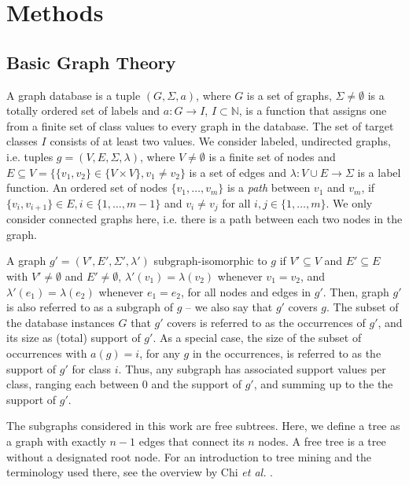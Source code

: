 \documentclass{sig-alternate}
\begin{document}
\section{Methods}
\label{s:Methods}

\subsection{Basic Graph Theory}
\label{ss:BasicGraphTheory}
A graph database is a tuple $(G, \Sigma, a)$, where $G$ is a set of graphs,
$\Sigma \ne \emptyset$  is a totally ordered set of labels and $a: G
\rightarrow I$, $I \subset \mathbb{N}$, is a function that assigns one from a
finite set of class values to every graph in the database.  The set of target
classes $I$ consists of at least two values.  We consider labeled, undirected
graphs, i.e. tuples $g=(V,E,\Sigma,\lambda)$, where $V\ne \emptyset$ is a
finite set of nodes and $E \subseteq V = \{\{v_1, v_2\} \in \{V \times V\}, v_1
\ne v_2\}$ is a set of edges and $\lambda: V\cup E \rightarrow \Sigma$ is a
label function.  
An ordered set of nodes $\{ v_1, \ldots, v_m\}$ is a \emph{path} between $v_1$ and $v_m$, if $\{v_i, v_{i+1}\} \in E, i \in \{1,\ldots,m-1\}$ and $v_i \neq v_j$ for all $i,j\in \{1,\ldots,m\}$.
We only consider connected graphs here, i.e.  there is a path
between each two nodes in the graph.

A graph $g'=(V',E',\Sigma',\lambda')$ subgraph-isomorphic to $g$ if $V'
\subseteq V$ and $E' \subseteq E$ with $V' \ne \emptyset$ and $E' \ne
\emptyset$, $\lambda'(v_1)=\lambda(v_2)$ whenever $v_1=v_2$, and
$\lambda'(e_1)=\lambda(e_2)$ whenever $e_1=e_2$, for all nodes and edges in
$g'$. Then, graph $g'$ is also referred to as a subgraph of $g$ -- we also say
that $g'$ covers $g$.  The subset of the database instances $G$ that $g'$
covers is referred to as the occurrences of $g'$, and its size as (total) support of
$g'$.  As a special case, the size of the subset of occurrences with $a(g)=i$,
for any $g$ in the occurrences, is referred to as the support of $g'$ for class
$i$. Thus, any subgraph has associated support values per class, ranging each
between 0 and the support of $g'$, and summing up to the the support of $g'$.

The subgraphs considered in this work are free subtrees. Here, we define a tree
as a graph with exactly $n-1$ edges that connect its $n$ nodes. A free tree is
a tree without a designated root node. For an introduction to tree mining and
the terminology used there, see the overview by Chi \emph{et al.}
\cite{CMNK01Frequent}.
\end{document}
